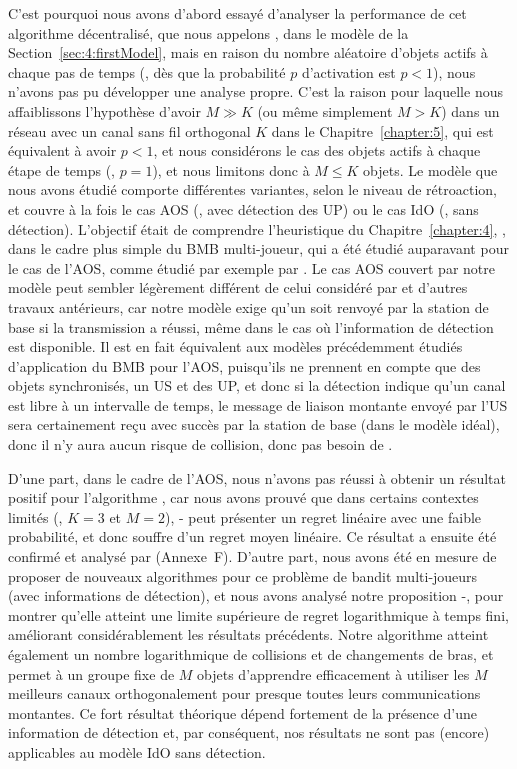 \begin{resume_fr}
C'est pourquoi nous avons d'abord essayé d'analyser la performance de cet algorithme décentralisé, que nous appelons \Selfish, dans le modèle de la Section~\ref{sec:4:firstModel},
mais en raison du nombre aléatoire d'objets actifs à chaque pas de temps (\ie, dès que la probabilité $p$ d'activation est $p < 1$), nous n'avons pas pu développer une analyse propre.
%
C'est la raison pour laquelle nous affaiblissons l'hypothèse d'avoir $M \gg K$ (ou même simplement $M > K$) dans un réseau avec un canal sans fil orthogonal $K$ dans le Chapitre~\ref{chapter:5}, qui est équivalent à avoir $p < 1$, et nous considérons le cas des objets actifs à chaque étape de temps (\ie, $p=1$), et nous limitons donc à $M \leq K$ objets.
Le modèle que nous avons étudié comporte différentes variantes, selon le niveau de rétroaction, et couvre à la fois le cas AOS (\ie, avec détection des UP) ou le cas IdO (\ie, sans détection).
L'objectif était de comprendre l'heuristique du Chapitre~\ref{chapter:4}, \Selfish, dans le cadre plus simple du BMB multi-joueur, qui a été étudié auparavant pour le cas de l'AOS, comme étudié par exemple par \cite{Zhao10,Anandkumar10,Anandkumar11}.
%
Le cas AOS couvert par notre modèle peut sembler légèrement différent de celui considéré par \cite{Jouini10} et d'autres travaux antérieurs,
car notre modèle exige qu'un \Ack{} soit renvoyé par la station de base si la transmission a réussi, même dans le cas où l'information de détection est disponible.
Il est en fait équivalent aux modèles précédemment étudiés d'application du BMB pour l'AOS, puisqu'ils ne prennent en compte que des objets synchronisés, un US et des UP, et donc si la détection indique qu'un canal est libre à un intervalle de temps, le message de liaison montante envoyé par l'US sera certainement reçu avec succès par la station de base (dans le modèle idéal), donc il n'y aura aucun risque de collision, donc pas besoin de \Ack.


D'une part, dans le cadre de l'AOS, nous n'avons pas réussi à obtenir un résultat positif pour l'algorithme \Selfish, car nous avons prouvé que dans certains contextes limités (\eg, $K=3$ et $M=2$), \Selfish-\UCB{} peut présenter un regret linéaire avec une faible probabilité, et donc souffre d'un regret moyen linéaire.
Ce résultat a ensuite été confirmé et analysé par \cite{BoursierPerchet18} (Annexe~F).
%
D'autre part, nous avons été en mesure de proposer de nouveaux algorithmes pour ce problème de bandit multi-joueurs (avec informations de détection), et nous avons analysé notre proposition \MCTopM-\klUCB, pour montrer qu'elle atteint une limite supérieure de regret logarithmique à temps fini, améliorant considérablement les résultats précédents.
Notre algorithme atteint également un nombre logarithmique de collisions et de changements de bras, et permet à un groupe fixe de $M$ objets d'apprendre efficacement à utiliser les $M$ meilleurs canaux orthogonalement pour presque toutes leurs communications montantes.
%
Ce fort résultat théorique dépend fortement de la présence d'une information de détection et, par conséquent, nos résultats ne sont pas (encore) applicables au modèle IdO sans détection.



\end{resume_fr}
